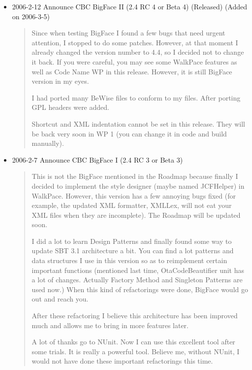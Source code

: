 \begin{itemize}
\begin{quotation}
  \end{quotation}

  \item 2006-2-12 Announce CBC BigFace II (2.4 RC 4 or Beta 4)
  (Released) (Added on 2006-3-5)

  \begin{quotation}
    Since when testing BigFace I found a few bugs that need urgent
    attention, I stopped to do some patches. However, at that moment I
    already changed the version number to 4.4, so I decided not to
    change it back. If you were careful, you may see some WalkPace
    features as well as Code Name WP in this release. However, it is
    still BigFace version in my eyes.

    I had ported many BeWise files to conform to my files. After porting
    GPL headers were added.

    Shortcut and XML indentation cannot be set in this release. They will
    be back very soon in WP 1 (you can change it in code and build
    manually).
  \end{quotation}
  \item 2006-2-7 Announce CBC BigFace I (2.4 RC 3 or Beta 3)

  \begin{quotation}
    This is not the BigFace mentioned in the Roadmap because finally I
    decided to implement the style designer (maybe named JCFHelper) in
    WalkPace. However, this version has a few annoying bugs fixed (for
    example, the updated XML formatter, XMLLex, will not eat your XML
    files when they are incomplete). The Roadmap will be updated soon.

    I did a lot to learn Design Patterns and finally found some way to
    update SBT 3.1 architecture a bit. You can find a lot patterns and
    data structures I use in this version so as to reimplement certain
    important functions (mentioned last time, OtaCodeBeautifier unit
    has a lot of changes. Actually Factory Method and Singleton
    Patterns are used now.) When this kind of refactorings were done,
    BigFace would go out and reach you.

    After these refactoring I believe this architecture has been improved
    much and allows me to bring in more features later.

    A lot of thanks go to NUnit. Now I can use this excellent tool after
    some trials. It is really a powerful tool. Believe me, without NUnit,
    I would not have done these important refactorings this time.
  \end{quotation}


\end{itemize}
